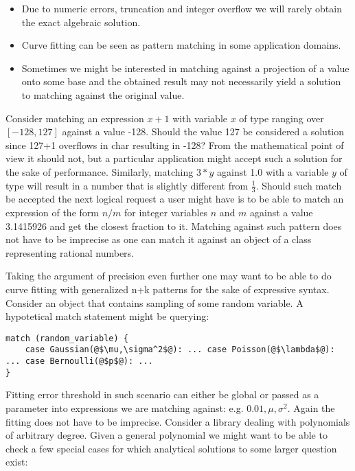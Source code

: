 \begin{itemize}
\item Due to numeric errors, truncation and integer overflow we will rarely 
      obtain the exact algebraic solution.
\item Curve fitting can be seen as pattern matching in some application domains. 
\item Sometimes we might be interested in matching against a projection of a 
      value onto some base and the obtained result may not necessarily yield a 
      solution to matching against the original value.
\end{itemize}

Consider matching an expression $x+1$ with variable $x$ of type  
ranging over $[-128,127]$ against a value -128. Should the value 127 be 
considered a solution since 127+1 overflows in char resulting in -128? From the 
mathematical point of view it should not, but a particular application might 
accept such a solution for the sake of performance. Similarly, matching $3*y$ 
against 1.0 with a variable $y$ of type  will result in a number 
that is slightly different from $\frac{1}{3}$. Should such match be accepted the 
next logical request a user might have is to be able to match an expression of 
the form $n/m$ for integer variables $n$ and $m$ against a value 3.1415926 and 
get the closest fraction to it. Matching against such pattern does not have to 
be imprecise as one can match it against an object of a class representing 
rational numbers.

Taking the argument of precision even further one may want to be able to do 
curve fitting with generalized n+k patterns for the sake of expressive syntax. 
Consider an object that contains sampling of some random variable. A hypotetical 
match statement might be querying:

\begin{lstlisting}[keepspaces,columns=flexible]
match (random_variable) { 
    case Gaussian(@$\mu,\sigma^2$@): ... case Poisson(@$\lambda$@): ... case Bernoulli(@$p$@): ... 
}
\end{lstlisting} 

Fitting error threshold in such scenario can either be global or passed 
as a parameter into expressions we are matching against: e.g. 
$0.01,\mu,\sigma^2$\code{):}.
Again the fitting does not have to be imprecise. Consider a library dealing with 
polynomials of arbitrary degree. Given a general polynomial we might want to be 
able to check a few special cases for which analytical solutions to some larger 
question exist:

